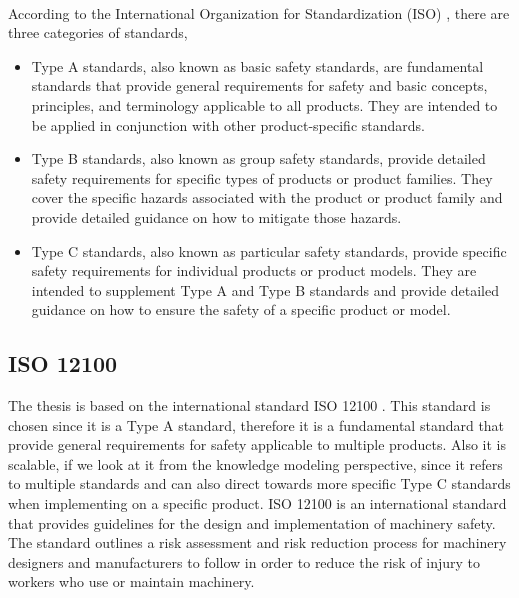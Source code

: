 \paragraph{} According to the International Organization for Standardization (ISO) \cite{ISO12100}, there are three categories of standards,
\begin{itemize}
    \item Type A standards, also known as basic safety standards, are fundamental standards that provide general requirements for safety and basic concepts, principles, and terminology applicable to all products. They are intended to be applied in conjunction with other product-specific standards.
    \item Type B standards, also known as group safety standards, provide detailed safety requirements for specific types of products or product families. They cover the specific hazards associated with the product or product family and provide detailed guidance on how to mitigate those hazards.
    \item Type C standards, also known as particular safety standards, provide specific safety requirements for individual products or product models. They are intended to supplement Type A and Type B standards and provide detailed guidance on how to ensure the safety of a specific product or model.
\end{itemize}

\subsection{ISO 12100} \label{iso12100}
The thesis is based on the international standard ISO 12100 \cite{ISO12100}. This standard is chosen since it is a Type A standard, therefore it is a fundamental standard that provide general requirements for safety applicable to multiple products. Also it is scalable, if we look at it from the knowledge modeling perspective, since it refers to multiple standards and can also direct towards more specific Type C standards when implementing on a specific product. ISO 12100 is an international standard that provides guidelines for the design and implementation of machinery safety. The standard outlines a risk assessment and risk reduction process for machinery designers and manufacturers to follow in order to reduce the risk of injury to workers who use or maintain machinery.

